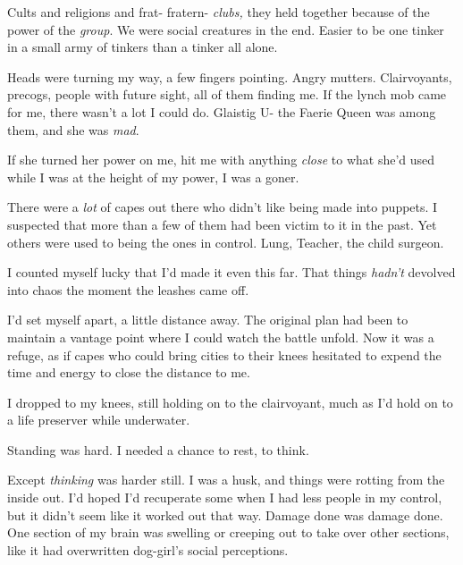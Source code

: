 Cults and religions and frat- fratern- \emph{clubs, }they held together because of the power of the \emph{group}.  We were social creatures in the end.  Easier to be one tinker in a small army of tinkers than a tinker all alone.



Heads were turning my way, a few fingers pointing.  Angry mutters.  Clairvoyants, precogs, people with future sight, all of them finding me.  If the lynch mob came for me, there wasn't a lot I could do.  Glaistig U- the Faerie Queen was among them, and she was \emph{mad}.



If she turned her power on me, hit me with anything \emph{close} to what she'd used while I was at the height of my power, I was a goner.



There were a \emph{lot} of capes out there who didn't like being made into puppets.  I suspected that more than a few of them had been victim to it in the past.  Yet others were used to being the ones in control.  Lung, Teacher, the child surgeon.



I counted myself lucky that I'd made it even this far.  That things \emph{hadn't} devolved into chaos the moment the leashes came off.



I'd set myself apart, a little distance away.  The original plan had been to maintain a vantage point where I could watch the battle unfold.  Now it was a refuge, as if capes who could bring cities to their knees hesitated to expend the time and energy to close the distance to me.



I dropped to my knees, still holding on to the clairvoyant, much as I'd hold on to a life preserver while underwater.



Standing was hard.  I needed a chance to rest, to think.



Except \emph{thinking} was harder still.  I was a husk, and things were rotting from the inside out.  I'd hoped I'd recuperate some when I had less people in my control, but it didn't seem like it worked out that way.  Damage done was damage done.  One section of my brain was swelling or creeping out to take over other sections, like it had overwritten dog-girl's social perceptions.



